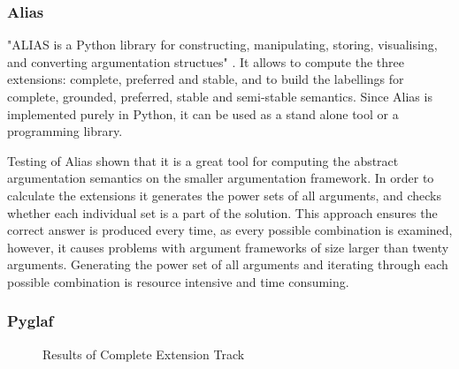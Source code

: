 \subsubsection{Alias}
"ALIAS is a Python library for constructing, manipulating, storing, visualising, and converting argumentation structues" \citep{alias}. It allows to compute the three extensions: complete, preferred and stable, and to build the labellings for complete, grounded, preferred, stable and semi-stable semantics. Since Alias is implemented purely in Python, it can be used as a stand alone tool or a programming library. 

Testing of Alias shown that it is a great tool for computing the abstract argumentation semantics on the smaller argumentation framework. In order to calculate the extensions it generates the power sets of all arguments, and checks whether each individual set is a part of the solution. This approach ensures the correct answer is produced every time, as every possible combination is examined, however, it causes problems with argument frameworks of size larger than twenty arguments. Generating the power set of all arguments and iterating through each possible combination is resource intensive and time consuming. 


\subsubsection{Pyglaf}

\begin{figure}
	\centering
	\caption{Results of Complete Extension Track}
	\label{fig:coTrack}
\end{figure}

